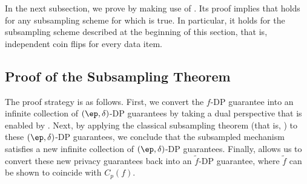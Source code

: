
In the next subsection, we prove  by making use of . Its proof implies that  holds for any subsampling scheme for which  is true. In particular, it holds for the subsampling scheme described at the beginning of this section, that is, independent coin flips for every data item. 




\subsection{Proof of the Subsampling Theorem} %
\label{sub:proof_of_subsample_theorems}
The proof strategy is as follows. First, we convert the $f$-DP guarantee into an infinite collection of $(\ep,\delta)$-DP guarantees by taking a dual perspective that is enabled by . Next, by applying the classical subsampling theorem (that is, ) to these $(\ep,\delta)$-DP guarantees, we conclude that the subsampled mechanism satisfies a new infinite collection of $(\ep,\delta)$-DP guarantees. Finally,  allows us to convert these new privacy guarantees back into an $\tilde{f}$-DP guarantee, where $\tilde f$ can be shown to coincide with $C_p(f)$.

